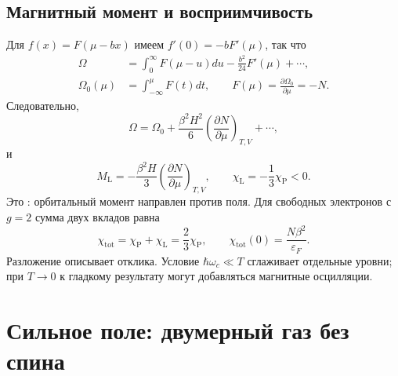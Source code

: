 \documentclass[../final.tex]{subfiles}
\begin{document}
\subsection{Магнитный момент и восприимчивость}
Для $f(x)=F(\mu-bx)$ имеем $f'(0)=-bF'(\mu)$, так что
\begin{align*}
 \Omega&=\int_0^\infty F(\mu-u)du-\frac{b^2}{24}F'(\mu)+\cdots,\\
 \Omega_0(\mu)&=\int_{-\infty}^{\mu}F(t)dt,
 \qquad F(\mu)=\frac{\partial\Omega_0}{\partial\mu}=-N.
\end{align*}
Следовательно,
\begin{equation*}
 \Omega=\Omega_0+\frac{\beta^2H^2}{6}
 \left(\frac{\partial N}{\partial\mu}\right)_{T,V}+\cdots,
\end{equation*}
и
\begin{equation*}
 M_{\mathrm L}=-\frac{\beta^2H}{3}\left(\frac{\partial N}{\partial\mu}\right)_{T,V},
 \qquad \chi_{\mathrm L}=-\frac13\chi_{\mathrm P}<0.
\end{equation*}
Это : орбитальный момент направлен против поля.
Для свободных электронов с $g=2$ сумма двух вкладов равна
\begin{equation*}
 \chi_{\mathrm{tot}}=\chi_{\mathrm P}+\chi_{\mathrm L}
 =\frac23\chi_{\mathrm P},\qquad
 \chi_{\mathrm{tot}}(0)=\frac{N\beta^2}{\varepsilon_F}.
\end{equation*}
Разложение описывает  отклика.
Условие $\hbar\omega_c\ll T$ сглаживает отдельные уровни; при $T\to0$
к гладкому результату могут добавляться магнитные осцилляции.

\section{Сильное поле: двумерный газ без спина}
\end{document}
